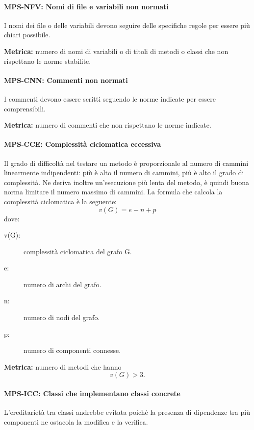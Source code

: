 \documentclass[../../norme-di-progetto.tex]{subfiles}
\begin{document}
\paragraph{MPS-NFV: Nomi di file e variabili non normati}%
\label{par:MPS-NFV_nomi_file_variabili_non_normati}

I nomi dei file o delle variabili devono seguire delle specifiche regole per essere più chiari possibile.

\textbf{Metrica:} numero di nomi di variabili o di titoli di metodi o classi che non rispettano le norme stabilite.

\paragraph{MPS-CNN: Commenti non normati}%
\label{par:MPS-CNN_commenti_non_normati}

I commenti devono essere scritti seguendo le norme indicate per essere comprensibili.

\textbf{Metrica:} numero di commenti che non rispettano le norme indicate.

\paragraph{MPS-CCE: Complessità ciclomatica eccessiva}%
\label{par:MPS-CCE_complessita_ciclomatica_eccessiva}

Il grado di difficoltà nel testare un metodo è proporzionale al numero di cammini linearmente indipendenti: più è alto il numero di cammini, più è alto il grado di complessità. Ne deriva inoltre un'esecuzione più lenta del metodo, è quindi buona norma limitare il numero massimo di cammini. La formula che calcola la complessità ciclomatica è la seguente:
\[
  v(G) = e - n + p
\]
dove:
\begin{description}
  \item[v(G):] complessità ciclomatica del grafo G. %
  \item[e:] numero di archi del grafo.
  \item[n:] numero di nodi del grafo.
  \item[p:] numero di componenti connesse.
\end{description}
\textbf{Metrica:} numero di metodi che hanno \[v(G) > 3.\]

\paragraph{MPS-ICC: Classi che implementano classi concrete}%
\label{par:MPS-ICC_classi_implementano_concrete}
L'ereditarietà tra classi andrebbe evitata poiché la presenza di dipendenze tra più componenti ne ostacola la modifica e la verifica.
\end{document}
